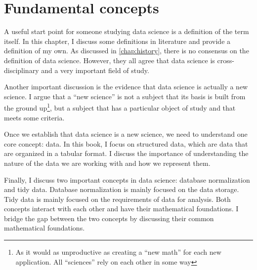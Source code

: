 \chapter{Fundamental concepts}
\label{chap:fundamental}
\glsresetall


A useful start point for someone studying data science is a definition of the term itself.
In this chapter, I discuss some definitions in literature and provide a definition of my
own.  As discussed in \cref{chap:history}, there is no consensus on the definition of data
science.  However, they all agree that data science is cross-disciplinary and a very
important field of study.

Another important discussion is the evidence that data science is actually a new science.
I argue that a ``new science'' is not a subject that its basis is built from the ground
up\footnote{As it would as unproductive as creating a ``new math'' for each new
application.  All ``sciences'' rely on each other in some way}, but a subject that has a
particular object of study and that meets some criteria.

Once we establish that data science is a new science, we need to understand one core
concept: data.  In this book, I focus on structured data, which are data that are organized
in a tabular format.  I discuss the importance of understanding the nature of the data we
are working with and how we represent them.

Finally, I discuss two important concepts in data science: database normalization and tidy
data.  Database normalization is mainly focused on the data storage.  Tidy data is mainly
focused on the requirements of data for analysis.  Both concepts interact with each other
and have their mathematical foundations.  I bridge the gap between the two concepts by
discussing their common mathematical foundations.

